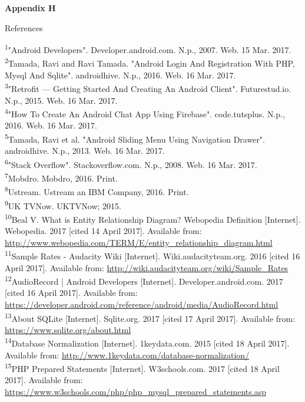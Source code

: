 \documentclass{article}
\begin{document}
\begin{flushleft}
{\Large \textbf{Appendix H}}\par
{\huge References}\par
\textsuperscript{1}"Android Developers". Developer.android.com. N.p., 2007. Web. 15 Mar. 2017.\\
\textsuperscript{2}Tamada, Ravi and Ravi Tamada. "Android Login And Registration With PHP, Mysql And Sqlite". androidhive. N.p., 2016. Web. 16 Mar. 2017.\\
\textsuperscript{3}"Retrofit — Getting Started And Creating An Android Client". Futurestud.io. N.p., 2015. Web. 16 Mar. 2017.\\
\textsuperscript{4}"How To Create An Android Chat App Using Firebase". code.tutsplus. N.p., 2016. Web. 16 Mar. 2017.\\
\textsuperscript{5}Tamada, Ravi et al. "Android Sliding Menu Using Navigation Drawer". androidhive. N.p., 2013. Web. 16 Mar. 2017.\\
\textsuperscript{6}"Stack Overflow". Stackoverflow.com. N.p., 2008. Web. 16 Mar. 2017.\\
\textsuperscript{7}Mobdro. Mobdro, 2016. Print.\\
\textsuperscript{8}Ustream. Ustream an IBM Company, 2016. Print.\\
\textsuperscript{9}UK TVNow. UKTVNow; 2015. \\
\textsuperscript{10}Beal V. What is Entity Relationship Diagram? Webopedia Definition [Internet]. Webopedia. 2017 [cited 14 April 2017]. Available from: \url {http://www.webopedia.com/TERM/E/entity_relationship_diagram.html}\\
\textsuperscript{11}Sample Rates - Audacity Wiki [Internet]. Wiki.audacityteam.org. 2016 [cited 16 April 2017]. Available from: \url{http://wiki.audacityteam.org/wiki/Sample_Rates}\\
\textsuperscript{12}AudioRecord | Android Developers [Internet]. Developer.android.com. 2017 [cited 16 April 2017]. Available from: \url{https://developer.android.com/reference/android/media/AudioRecord.html}\\
\textsuperscript{13}About SQLite [Internet]. Sqlite.org. 2017 [cited 17 April 2017]. Available from: \url{https://www.sqlite.org/about.html}\\
\textsuperscript{14}Database Normalization [Internet]. 1keydata.com. 2015 [cited 18 April 2017]. Available from: \url{http://www.1keydata.com/database-normalization/}\\
\textsuperscript{15}PHP Prepared Statements [Internet]. W3schools.com. 2017 [cited 18 April 2017]. Available from: \url{https://www.w3schools.com/php/php_mysql_prepared_statements.asp}\\

\end{flushleft}
\end{document}
